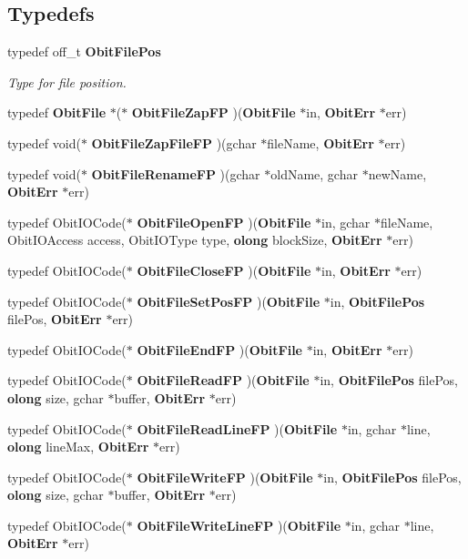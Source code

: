 \subsection*{Typedefs}
\begin{CompactItemize}
\item 
typedef off\_\-t {\bf Obit\-File\-Pos}
\begin{CompactList}\small\item\em Type for file position. \item\end{CompactList}\item 
typedef {\bf Obit\-File} $\ast$($\ast$ {\bf Obit\-File\-Zap\-FP} )({\bf Obit\-File} $\ast$in, {\bf Obit\-Err} $\ast$err)
\item 
typedef void($\ast$ {\bf Obit\-File\-Zap\-File\-FP} )(gchar $\ast$file\-Name, {\bf Obit\-Err} $\ast$err)
\item 
typedef void($\ast$ {\bf Obit\-File\-Rename\-FP} )(gchar $\ast$old\-Name, gchar $\ast$new\-Name, {\bf Obit\-Err} $\ast$err)
\item 
typedef Obit\-IOCode($\ast$ {\bf Obit\-File\-Open\-FP} )({\bf Obit\-File} $\ast$in, gchar $\ast$file\-Name, Obit\-IOAccess access, Obit\-IOType type, {\bf olong} block\-Size, {\bf Obit\-Err} $\ast$err)
\item 
typedef Obit\-IOCode($\ast$ {\bf Obit\-File\-Close\-FP} )({\bf Obit\-File} $\ast$in, {\bf Obit\-Err} $\ast$err)
\item 
typedef Obit\-IOCode($\ast$ {\bf Obit\-File\-Set\-Pos\-FP} )({\bf Obit\-File} $\ast$in, {\bf Obit\-File\-Pos} file\-Pos, {\bf Obit\-Err} $\ast$err)
\item 
typedef Obit\-IOCode($\ast$ {\bf Obit\-File\-End\-FP} )({\bf Obit\-File} $\ast$in, {\bf Obit\-Err} $\ast$err)
\item 
typedef Obit\-IOCode($\ast$ {\bf Obit\-File\-Read\-FP} )({\bf Obit\-File} $\ast$in, {\bf Obit\-File\-Pos} file\-Pos, {\bf olong} size, gchar $\ast$buffer, {\bf Obit\-Err} $\ast$err)
\item 
typedef Obit\-IOCode($\ast$ {\bf Obit\-File\-Read\-Line\-FP} )({\bf Obit\-File} $\ast$in, gchar $\ast$line, {\bf olong} line\-Max, {\bf Obit\-Err} $\ast$err)
\item 
typedef Obit\-IOCode($\ast$ {\bf Obit\-File\-Write\-FP} )({\bf Obit\-File} $\ast$in, {\bf Obit\-File\-Pos} file\-Pos, {\bf olong} size, gchar $\ast$buffer, {\bf Obit\-Err} $\ast$err)
\item 
typedef Obit\-IOCode($\ast$ {\bf Obit\-File\-Write\-Line\-FP} )({\bf Obit\-File} $\ast$in, gchar $\ast$line, {\bf Obit\-Err} $\ast$err)

\end{CompactItemize}
